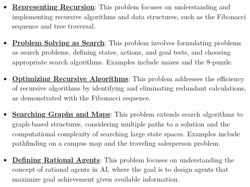 \documentclass{article}%
\begin{document}
\begin{itemize}[leftmargin=*]%
\item \href{https://purdue.brightspace.com/d2l/common/assets/pdfjs-d2l-dist/1.0.14-legacy/web/viewer.html?file=\%2Fcontent\%2Fenforced\%2F1095467-wl.202510.CS.24300.001\%2F14L1-DepthFS.pdf\%3Fou\%3D1095467\&lang=en-us\&container=d2l-fileviewer-rendered-pdf\&fullscreen=d2l-fileviewer-rendered-pdf-dialog\&height=667#page=3}{\textbf{Representing Recursion}}: This problem focuses on understanding and implementing recursive algorithms and data structures, such as the Fibonacci sequence and tree traversal.%
\item \href{https://purdue.brightspace.com/d2l/common/assets/pdfjs-d2l-dist/1.0.14-legacy/web/viewer.html?file=\%2Fcontent\%2Fenforced\%2F1095467-wl.202510.CS.24300.001\%2F14L1-DepthFS.pdf\%3Fou\%3D1095467\&lang=en-us\&container=d2l-fileviewer-rendered-pdf\&fullscreen=d2l-fileviewer-rendered-pdf-dialog\&height=667#page=12}{\textbf{Problem Solving as Search}}: This problem involves formulating problems as search problems, defining states, actions, and goal tests, and choosing appropriate search algorithms. Examples include mazes and the 8-puzzle.%
\item \href{https://purdue.brightspace.com/d2l/common/assets/pdfjs-d2l-dist/1.0.14-legacy/web/viewer.html?file=\%2Fcontent\%2Fenforced\%2F1095467-wl.202510.CS.24300.001\%2F14L1-DepthFS.pdf\%3Fou\%3D1095467\&lang=en-us\&container=d2l-fileviewer-rendered-pdf\&fullscreen=d2l-fileviewer-rendered-pdf-dialog\&height=667#page=21}{\textbf{Optimizing Recursive Algorithms}}: This problem addresses the efficiency of recursive algorithms by identifying and eliminating redundant calculations, as demonstrated with the Fibonacci sequence.%
\item \href{https://purdue.brightspace.com/d2l/common/assets/pdfjs-d2l-dist/1.0.14-legacy/web/viewer.html?file=\%2Fcontent\%2Fenforced\%2F1095467-wl.202510.CS.24300.001\%2F14L1-DepthFS.pdf\%3Fou\%3D1095467\&lang=en-us\&container=d2l-fileviewer-rendered-pdf\&fullscreen=d2l-fileviewer-rendered-pdf-dialog\&height=667#page=25}{\textbf{Searching Graphs and Maps}}: This problem extends search algorithms to graph-based structures, considering multiple paths to a solution and the computational complexity of searching large state spaces. Examples include pathfinding on a campus map and the traveling salesperson problem.%
\item \href{https://purdue.brightspace.com/d2l/common/assets/pdfjs-d2l-dist/1.0.14-legacy/web/viewer.html?file=\%2Fcontent\%2Fenforced\%2F1095467-wl.202510.CS.24300.001\%2F14L1-DepthFS.pdf\%3Fou\%3D1095467\&lang=en-us\&container=d2l-fileviewer-rendered-pdf\&fullscreen=d2l-fileviewer-rendered-pdf-dialog\&height=667#page=39}{\textbf{Defining Rational Agents}}: This problem focuses on understanding the concept of rational agents in AI, where the goal is to design agents that maximize goal achievement given available information.%
\end{itemize}%
\end{document}
